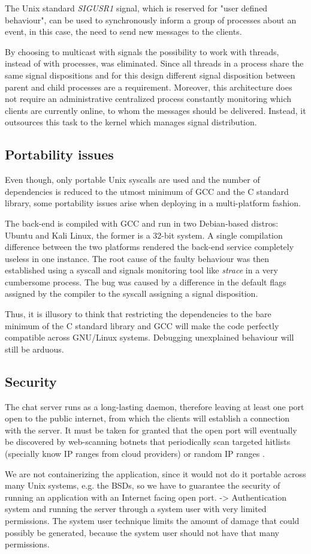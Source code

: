 The Unix standard \textit{SIGUSR1} signal, which is reserved for "user defined behaviour", can be used to synchronously inform a group of processes about an event, in this case, the need to send new messages to the clients.

By choosing to multicast with signals the possibility to work with threads, instead of with processes, was eliminated. Since all threads in a process share the same signal dispositions and for this design different signal disposition between parent and child processes are a requirement. Moreover, this architecture does not require an administrative centralized process constantly monitoring which clients are currently online, to whom the messages should be delivered. Instead, it outsources this task to the kernel which manages signal distribution.


\subsection{Portability issues}
Even though, only portable Unix syscalls are used and the number of dependencies is reduced to the utmost minimum of GCC and the C standard library, some portability issues arise when deploying in a multi-platform fashion.

The back-end is compiled with GCC and run in two Debian-based distros: Ubuntu and Kali Linux, the former is a 32-bit system. A single compilation difference between the two platforms rendered the back-end service completely useless in one instance. The root cause of the faulty behaviour was then established using a syscall and signals monitoring tool like \textit{strace} in a very cumbersome process. The bug was caused by a difference in the default flags assigned by the compiler to the syscall assigning a signal disposition.

Thus, it is illusory to think that restricting the dependencies to the bare minimum of the C standard library and GCC will make the code perfectly compatible across GNU/Linux systems. Debugging unexplained behaviour will still be arduous.

\subsection{Security}
The chat server runs as a long-lasting daemon, therefore leaving at least one port open to the public internet, from which the clients will establish a connection with the server. It must be taken for granted that the open port will eventually be discovered by web-scanning botnets that periodically scan targeted hitlists (specially know IP ranges from cloud providers) or random IP ranges \cite{Mirkovic2004}\cite{Graham}.

We are not containerizing the application, since it would not do it portable across many Unix systems, e.g. the BSDs, so we have to guarantee the security of running an application with an Internet facing open port. -> Authentication system and running the server through a system user with very limited permissions.
The system user technique limits the amount of damage that could possibly be generated, because the system user should not  have that many permissions. \cite{Kerrisk2021}

